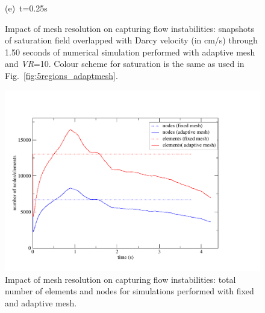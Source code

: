 \begin{figure}[ht]
{      \vspace{-.1cm}\hbox{\hspace{2.cm}(e) t=0.25s}\vspace{-.1cm}}
\caption{Impact of mesh resolution on capturing flow instabilities: snapshots of saturation field overlapped with Darcy velocity (in cm/s) through 1.50 seconds of numerical simulation performed with adaptive mesh and {\it VR}=10. Colour scheme for saturation is the same as used in Fig.~\ref{fig:5regions_adaptmesh}.}
\label{fig:5regions_adaptmeshvels}
\end{figure}
\clearpage


\begin{figure}[ht] 
\includegraphics[width=\textwidth]{./Pics1/Section4_4/Five_regions_adapt_PlotTimeNodesElements.pdf}
\caption{Impact of mesh resolution on capturing flow instabilities: total number of elements and nodes for simulations performed with fixed and adaptive mesh. }
\label{fig:5regions_plottimenodeselements}
\end{figure}



